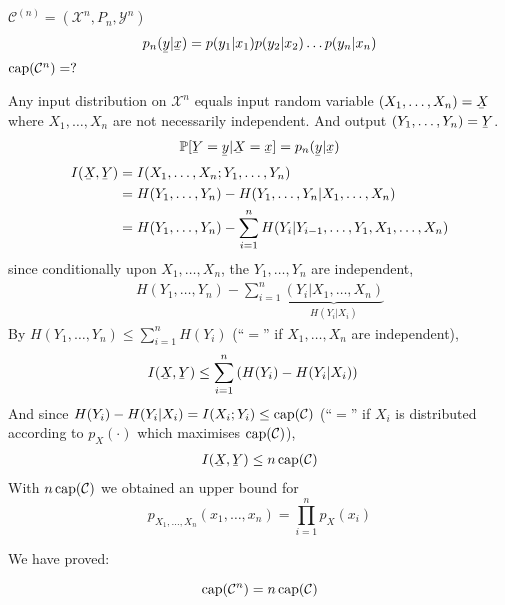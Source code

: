\documentclass[mfit.tex]{subfiles}
\begin{document}
\begin{rem}[Recall]
  $\mathcal{C}^{(n)} = (\mathcal{X}^n, P_n, \mathcal{Y}^n)$
  \begin{align*}
    p_n(\ubar{y}|\ubar{x}) = p(y_1|x_1) p(y_2|x_2) \dots p(y_n|x_n)
  \end{align*}
  $\operatorname{cap}(\mathcal{C}^n) = ?$
  
  Any input distribution on $\mathcal{X}^n$ equals input random variable $(X_1,\dots,X_n) = \ubar{X}$ where $X_1,\dots,X_n$ are not necessarily independent.
  And output $(Y_1,\dots,Y_n) = \ubar{Y}$.
  \begin{align*}
    \prob[\ubar{Y} = \ubar{y}|\ubar{X} = \ubar{x}] = p_n(\ubar{y}|\ubar{x})
  \end{align*}
  \begin{align*}
    I(\ubar{X},\ubar{Y}) &= I(X_1,\dots,X_n;Y_1,\dots,Y_n) \\
    &= H(Y_1,\dots,Y_n) - H(Y_1,\dots,Y_n|X_1,\dots,X_n) \\
    &= H(Y_1,\dots,Y_n) - \sum_{i=1}^n H(Y_i|Y_{i-1},\dots,Y_1,X_1,\dots,X_n) \\
  \end{align*}
  since conditionally upon $X_1,\dots,X_n$, the $Y_1,\dots,Y_n$ are independent,
  \begin{align*}
    H(Y_1,\dots,Y_n) - \sum_{i=1}^n \underbrace{(Y_i|X_1,\dots,X_n)}_{H(Y_i|X_i)} 
  \end{align*}
  By $H(Y_1,\dots,Y_n) \leq \sum_{i=1}^n H(Y_i)$ (\enquote{$=$} if $X_1,\dots,X_n$ are independent),
  \begin{align*}
    I(\ubar{X},\ubar{Y}) &\leq \sum_{i=1}^n \left( H(Y_i) - H(Y_i|X_i) \right)
  \end{align*}
  And since $H(Y_i) - H(Y_i|X_i) = I(X_i;Y_i) \leq \operatorname{cap}(\mathcal{C})$ (\enquote{$=$} if $X_i$ is distributed according to $p_X(\cdot)$ which maximises $\operatorname{cap}(\mathcal{C})$),
  \begin{align*}
    I(\ubar{X},\ubar{Y}) \leq n \capa(\mathcal{C})
  \end{align*}
  With $n \operatorname{cap}(\mathcal{C})$ we obtained an upper bound for
  \[ p_{X_1,\dots,X_n}(x_1,\dots,x_n) = \prod_{i=1}^n p_X(x_i) \]
\end{rem}

We have proved:

\begin{prop}
  \[ \operatorname{cap}(\mathcal{C}^n) = n\operatorname{cap}(\mathcal{C}) \]
\end{prop}
\end{document}
